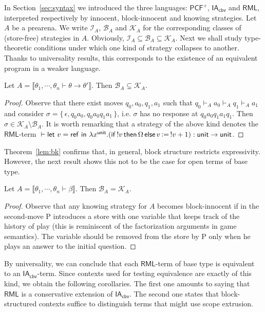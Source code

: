 \documentclass{CSML}
\theoremstyle{definition}\newtheorem{definition}[thm]{Definition}
\theoremstyle{definition}\newtheorem{example}[thm]{Example}
\theoremstyle{definition}\newtheorem{proposition}[thm]{Proposition}
\theoremstyle{definition}\newtheorem{lemma}[thm]{Lemma}
\theoremstyle{definition}\newtheorem{theorem}[thm]{Theorem}
\theoremstyle{definition}\newtheorem{corollary}[thm]{Corollary}
\theoremstyle{definition}\newtheorem{remark}[thm]{Remark}
\newcommand\nt[1]{#1}
\newcommand\pcfplus{\mathsf{PCF}^+}
\newcommand\iacbv{\mathsf{IA}_{\mathsf{cbv}}}
\newcommand\rml{\mathsf{RML}}
\newcommand\letin[2]{\mathsf{let}\ #1\ \mathsf{in}\ #2}
\newcommand{\aasg}{\,\raisebox{0.065ex}{:}{=}\,}
\newcommand\comt{\mathsf{unit}}
\newcommand\cond[3]{\mathsf{if}\,#1\,\mathsf{then}\,#2\,\mathsf{else}\,#3}
\newcommand{\rarr}{\rightarrow}
\newcommand\makeset[1]{\{\,#1\,\}}
\newcommand\sem[1]{\llbracket #1 \rrbracket}
\newcommand\seq[2]{{#1} \vdash {#2}}
\newcommand\newc{\mathsf{ref}}
\newcommand\knowing[1]{\mathcal{K}_{#1}}
\newcommand\binno[1]{\mathcal{B}_{#1}}
\newcommand\inno[1]{\mathcal{I}_{#1}}
\begin{document}
In Section~\ref{sec:syntax} we introduced the three languages: $\pcfplus$,
$\iacbv$ and $\rml$, interpreted respectively by innocent, block-innocent and knowing 
 strategies. Let $A$ be a \nt{prearena}. We write $\inno{A}$, $\binno{A}$ and $\knowing{A}$
for the corresponding classes of (store-free) strategies  in $A$.
Obviously, $\inno{A}\subseteq \binno{A}\subseteq \knowing{A}$.
 Next we shall study type-theoretic conditions under which
 one kind of strategy collapses to another. Thanks to universality results,
 this corresponds to the existence of an equivalent program in a weaker language.
 \begin{thm}\label{lem:bk}
Let $A=\sem{\seq{\theta_1, \cdots, \theta_n}{\theta\rarr\theta'}}$.
Then $\binno{A}\subsetneq\knowing{A}$.
\end{thm}
\begin{proof}
Observe that there exist moves $q_0, a_0, q_1, a_1$ such that
$q_0\vdash_A a_0\vdash_A q_1\vdash_A a_1$ and consider
$\sigma=\makeset{\epsilon, q_0 a_0, q_0 a_0 q_1 a_1}$, i.e. $\sigma$
has no response at $q_0 a_0 q_1 a_1 q_1$. Then $\sigma\in \knowing{A}\setminus\binno{A}$.
It is worth remarking that a strategy of the above kind denotes the $\rml$-term
$\seq{}{\letin{v=\newc}{\lambda x^\comt. (\cond{!v}{\Omega}{v\aasg !v+1}}):\comt\rarr\comt}$.
\end{proof}
Theorem~\ref{lem:bk} confirms that, in general, block structure restricts expressivity.
However,  the next result shows this not to be the case for open terms of base type.
\begin{thm}
Let  $A=\sem{\seq{\theta_1, \cdots, \theta_n}{\beta}}$.
Then $\binno{A}=\knowing{A}$.
\end{thm}
\begin{proof}
Observe that any knowing strategy for $A$ becomes block-innocent if
in the second-move P introduces a store with one variable that keeps track of the history of
play (this is reminiscent of the factorization arguments in game semantics).
The variable should be removed from the store by P only when he plays an
answer to the initial question.
\end{proof}
By universality, we can conclude that each $\rml$-term of base type
is equivalent to an $\iacbv$-term. Since contexts used for
testing equivalence are exactly of this kind, we obtain the following corollaries.
The first one amounts to saying that $\rml$ is a conservative extension of $\iacbv$.
The second one states that block-structured contexts suffice to distinguish
terms that might use scope extrusion.
\end{document}
